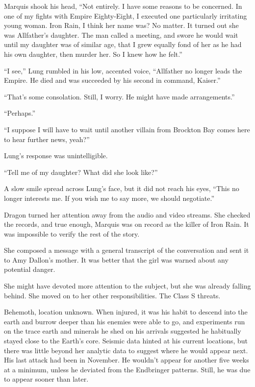 Marquis shook his head, ``Not entirely.  I have some reasons to be concerned.  In one of my fights with Empire Eighty-Eight, I executed one particularly irritating young woman.  Iron Rain, I think her name was?  No matter.  It turned out she was Allfather's daughter.  The man called a meeting, and swore he would wait until my daughter was of similar age, that I grew equally fond of her as he had his own daughter, then murder her.  So I knew how he felt.''



``I see,'' Lung rumbled in his low, accented voice, ``Allfather no longer leads the Empire.  He died and was succeeded by his second in command, Kaiser.''



``That's some consolation.  Still, I worry.  He might have made arrangements.''



``Perhaps.''



``I suppose I will have to wait until another villain from Brockton Bay comes here to hear further news, yeah?''



Lung's response was unintelligible.



``Tell me of my daughter?  What did she look like?''



A slow smile spread across Lung's face, but it did not reach his eyes, ``This no longer interests me.  If you wish me to say more, we should negotiate.''



Dragon turned her attention away from the audio and video streams.  She checked the records, and true enough, Marquis was on record as the killer of Iron Rain.  It was impossible to verify the rest of the story.



She composed a message with a general transcript of the conversation and sent it to Amy Dallon's mother.  It was better that the girl was warned about any potential danger.



She might have devoted more attention to the subject, but she was already falling behind.  She moved on to her other responsibilities.  The Class S threats.



Behemoth, location unknown.  When injured, it was his habit to descend into the earth and burrow deeper than his enemies were able to go, and experiments run on the trace earth and minerals he shed on his arrivals suggested he habitually stayed close to the Earth's core.   Seismic data hinted at his current locations, but there was little beyond her analytic data to suggest where he would appear next.  His last attack had been in November.  He wouldn't appear for another five weeks at a minimum, unless he deviated from the Endbringer patterns.  Still, he was due to appear sooner than later.



